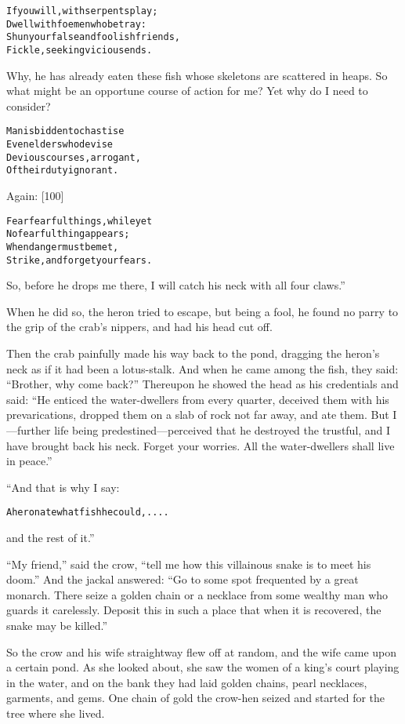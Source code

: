 \documentclass{article}
\renewenvironment{verbatim}{\begin{alltt}\normalfont\begin{centering}}{\end{centering}\end{alltt}}
\begin{document}
\begin{verbatim}
If you will, with serpents play;
Dwell with foemen who betray:
Shun your false and foolish friends,
Fickle, seeking vicious ends.
\end{verbatim}
Why, he has already eaten these fish whose skeletons are scattered
in heaps. So what might be an opportune course of action for me?
Yet why do I need to consider?

\begin{verbatim}
Man is bidden to chastise
Even elders who devise
Devious courses, arrogant,
Of their duty ignorant.
\end{verbatim}
Again: [100]

\begin{verbatim}
Fear fearful things, while yet
    No fearful thing appears;
When danger must be met,
    Strike, and forget your fears.
\end{verbatim}
So, before he drops me there, I will catch his neck with all four
claws.”

When he did so, the heron tried to escape, but being a fool, he
found no parry to the grip of the crab's nippers, and had his head
cut off.

Then the crab painfully made his way back to the pond, dragging the
heron's neck as if it had been a lotus-stalk. And when he came
among the fish, they said: ``Brother, why come back?'' Thereupon he
showed the head as his credentials and said:
``He enticed the water-dwellers from every quarter, deceived them with his prevarications, dropped them on a slab of rock not far away, and ate them. But I---further life being predestined---perceived that he destroyed the trustful, and I have brought back his neck. Forget your worries. All the water-dwellers shall live in peace.''

“And that is why I say:

\begin{verbatim}
A heron ate what fish he could, ....
\end{verbatim}
and the rest of it.”

``My friend,'' said the crow,
``tell me how this villainous snake is to meet his doom.'' And the
jackal answered:
``Go to some spot frequented by a great monarch. There seize a golden chain or a necklace from some wealthy man who guards it carelessly. Deposit this in such a place that when it is recovered, the snake may be killed.''

So the crow and his wife straightway flew off at random, and the
wife came upon a certain pond. As she looked about, she saw the
women of a king's court playing in the water, and on the bank they
had laid golden chains, pearl necklaces, garments, and gems. One
chain of gold the crow-hen seized and started for the tree where
she lived.
\end{document}
